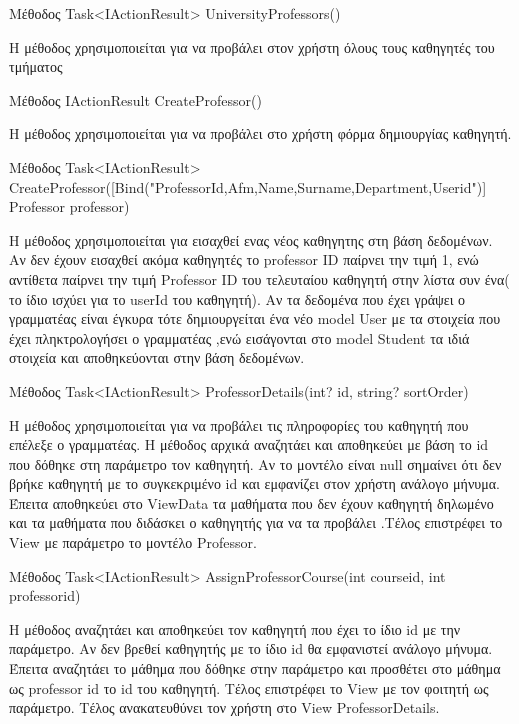 \documentclass[12pt]{article}
\begin{document}
	Μέθοδος Task<IActionResult> UniversityProfessors()

	Η μέθοδος χρησιμοποιείται για να προβάλει στον χρήστη όλους τους καθηγητές του τμήματος
	
	
	Μέθοδος IActionResult CreateProfessor()

	Η μέθοδος χρησιμοποιείται για να προβάλει στο χρήστη φόρμα δημιουργίας καθηγητή.
	
	
	Μέθοδος Task<IActionResult> CreateProfessor([Bind("ProfessorId,Afm,Name,Surname,Department,Userid")] Professor professor)

	Η μέθοδος χρησιμοποιείται για εισαχθεί ενας νέος καθηγητης στη βάση δεδομένων. Αν δεν έχουν εισαχθεί ακόμα καθηγητές το  professor ID παίρνει την τιμή 1, ενώ αντίθετα παίρνει την τιμή Professor ID του τελευταίου καθηγητή στην λίστα συν ένα( το ίδιο ισχύει για το userId του καθηγητή). Αν τα δεδομένα που έχει γράψει ο γραμματέας είναι έγκυρα τότε δημιουργείται ένα νέο model User με τα στοιχεία που έχει πληκτρολογήσει ο γραμματέας ,ενώ εισάγονται στο model Student τα ιδιά στοιχεία και αποθηκεύονται στην βάση δεδομένων.
	
	
	Μέθοδος Task<IActionResult> ProfessorDetails(int? id, string? sortOrder)

	Η μέθοδος χρησιμοποιείται για να προβάλει τις πληροφορίες του καθηγητή που επέλεξε ο γραμματέας. Η μέθοδος αρχικά αναζητάει και αποθηκεύει με βάση το id που δόθηκε στη παράμετρο τον καθηγητή. Αν το μοντέλο είναι null σημαίνει ότι δεν βρήκε καθηγητή με το συγκεκριμένο id και εμφανίζει στον χρήστη ανάλογο μήνυμα. Έπειτα αποθηκεύει στο ViewData τα  μαθήματα που δεν έχουν καθηγητή δηλωμένο και τα μαθήματα που διδάσκει ο καθηγητής  για να τα προβάλει .Τέλος επιστρέφει το View με παράμετρο το μοντέλο Professor.
	
	
	Μέθοδος Task<IActionResult> AssignProfessorCourse(int courseid, int professorid)

	Η μέθοδος αναζητάει και αποθηκεύει τον καθηγητή που έχει το ίδιο id με την παράμετρο. Αν δεν βρεθεί καθηγητής με το ίδιο id θα εμφανιστεί ανάλογο μήνυμα. Έπειτα αναζητάει το μάθημα που δόθηκε στην παράμετρο και προσθέτει στο μάθημα ως professor id το id του καθηγητή. Τέλος επιστρέφει το View με τον φοιτητή ως παράμετρο. Τέλος ανακατευθύνει τον χρήστη στο View ProfessorDetails.
	
\end{document}

